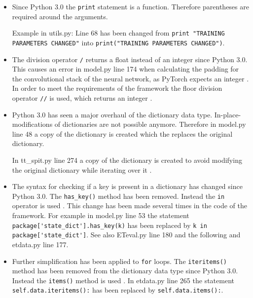 \documentclass[conference]{IEEEtran}
\begin{document}
\begin{itemize}
    \item Since Python 3.0 the \verb|print| statement is a function. Therefore parentheses are required around the arguments. \cite{van_Rossum_2009}
    
    Example in utils.py: Line 68 has been changed from \verb|print "TRAINING PARAMETERS CHANGED"| into \verb|print("TRAINING PARAMETERS CHANGED")|.

    \item The division operator \verb|/| returns a float instead of an integer since Python 3.0. This causes an error in model.py line 174 when calculating the padding for the convolutional stack of the neural network, as PyTorch expects an integer \cite{Contributors_2023}. In order to meet the requirements of the framework the floor division operator \verb|//| is used, which returns an integer \cite{van_Rossum_2009}.
    
    \item Python 3.0 has seen a major overhaul of the dictionary data type. In-place-modifications of dictionaries are not possible anymore. Therefore in model.py line 48 a copy of the dictionary is created which the replaces the original dictionary.
    
    In tt\_spit.py line 274 a copy of the dictionary is created to avoid modifying the original dictionary while iterating over it \cite{van_Rossum_2009}.
    
    \item The syntax for checking if a key is present in a dictionary has changed since Python 3.0. The \verb|has_key()| method has been removed. Instead the \verb|in| operator is used \cite{van_Rossum_2009}. This change has been made several times in the code of the framework. For example in model.py line 53 the statement \verb|package['state_dict'].has_key(k)| has been replaced by \verb|k in package['state_dict']|. See also ETeval.py line 180 and the following and etdata.py line 177.

    \item Further simplification has been applied to \verb|for| loops. The \verb|iteritems()| method has been removed from the dictionary data type since Python 3.0. Instead the \verb|items()| method is used \cite{van_Rossum_2009}. In etdata.py line 265 the statement \verb|self.data.iteritems():| has been replaced by \verb|self.data.items():|.
    
\end{itemize}
\end{document}
